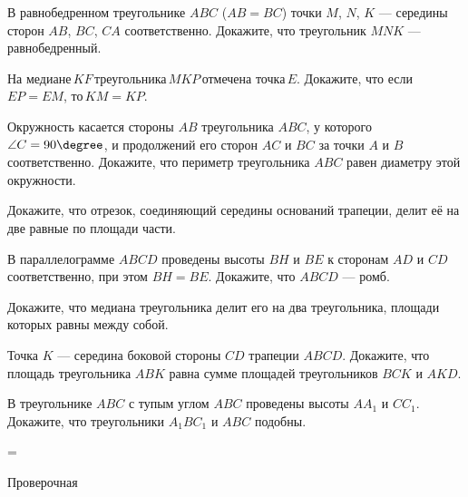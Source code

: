 \begin{class}[number=7]
	\begin{listofex}
		\item В равнобедренном треугольнике \( ABC \) (\( AB=BC \)) точки \( M \), \( N \), \( K \) --- середины сторон \( AB \), \( BC \), \( CA \) соответственно. Докажите, что треугольник \( MNK \) --- равнобедренный.
		\item На медиане \( KF \) треугольника \( MKP \) отмечена точка \( E \). Докажите, что если \( EP=EM \), то \( KM=KP \).
		\item Окружность касается стороны \( AB \) треугольника \( ABC \), у которого \( \angle C=90\degree \), и продолжений его сторон \( AC \) и \( BC \) за точки \( A \) и \( B \) соответственно. Докажите, что периметр треугольника \( ABC \) равен диаметру этой окружности.
		\item Докажите, что отрезок, соединяющий середины оснований трапеции, делит её на две равные по площади части.
		\item В параллелограмме \( ABCD \) проведены высоты \( BH \) и \( BE \) к сторонам \( AD \) и \( CD \) соответственно, при этом \( BH=BE \). Докажите, что \( ABCD \) --- ромб.
		\item Докажите, что медиана треугольника делит его на два треугольника, площади которых равны между собой.
		\item Точка \( K \) --- середина боковой стороны \( CD \) трапеции \( ABCD \). Докажите, что площадь треугольника \( ABK \) равна сумме площадей треугольников \( BCK \) и \( AKD \).
		\item В треугольнике \( ABC \) с тупым углом \( ABC \) проведены высоты \( AA_1 \) и \( CC_1 \). Докажите, что треугольники \( A_1BC_1 \) и \( ABC \) подобны.
	\end{listofex}
\end{class}

=%
\begin{exam}
	\begin{listofex}
		\item Проверочная
	\end{listofex}
\end{exam}

